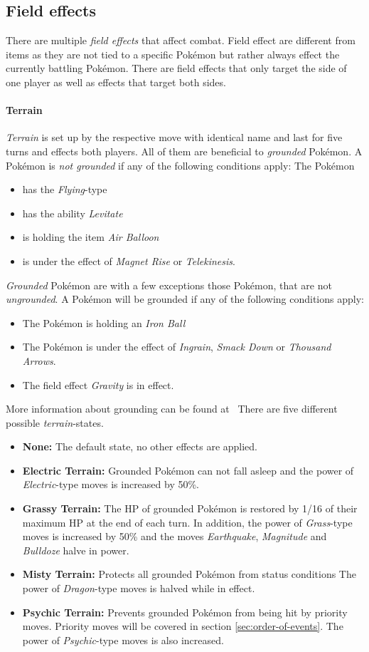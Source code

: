 \subsection{Field effects}
\label{sec:field-effects}
There are multiple \textit{field effects} that affect combat. Field effect are different from items as they are not
tied to a specific Pokémon but rather always effect the currently battling Pokémon. There are field effects that only
target the side of one player as well as effects that target both sides. 
\paragraph{Terrain}
\textit{Terrain} is set up by the respective move with identical name and last for five turns and effects both players.
All of them are beneficial to \textit{grounded} Pokémon. A Pokémon is \textit{not grounded} if any of the 
following conditions apply: The Pokémon
\begin{itemize}
	\item has the \textit{Flying}-type
	\item has the ability \textit{Levitate}
	\item is holding the item \textit{Air Balloon}
	\item is under the effect of \textit{Magnet Rise} or \textit{Telekinesis}.
\end{itemize}
\textit{Grounded} Pokémon are with a few exceptions those Pokémon, that are not \textit{ungrounded}. A 
Pokémon will be grounded if any of the following conditions apply:
\begin{itemize}
	\item The Pokémon is holding an \textit{Iron Ball}
	\item The Pokémon is under the effect of \textit{Ingrain}, \textit{Smack Down} or \textit{Thousand Arrows}.
	\item The field effect \textit{Gravity} is in effect.
\end{itemize}
More information about grounding can be found at~\autocite{Bulbapedia:Grounded}
There are five different possible \textit{terrain}-states. 
\begin{itemize}
	\item \textbf{None:} The default state, no other effects are applied. 
	\item \textbf{Electric Terrain:} Grounded Pokémon can not fall asleep and the power of \textit{Electric}-type
		moves is increased by 50\%.
	\item \textbf{Grassy Terrain:} The HP of grounded Pokémon is restored by 1/16 of their maximum HP at the
		end of each turn. In addition, the power of \textit{Grass}-type moves is increased by 50\% and the 
		moves \textit{Earthquake}, \textit{Magnitude} and \textit{Bulldoze} halve in power. 
	\item \textbf{Misty Terrain:} Protects all grounded Pokémon from status conditions
		The power of \textit{Dragon}-type moves is halved while in effect. 
	\item \textbf{Psychic Terrain:} Prevents grounded Pokémon from being hit by priority moves. Priority
	moves will be covered in section \ref{sec:order-of-events}. The power of \textit{Psychic}-type moves is also increased.
\end{itemize}
